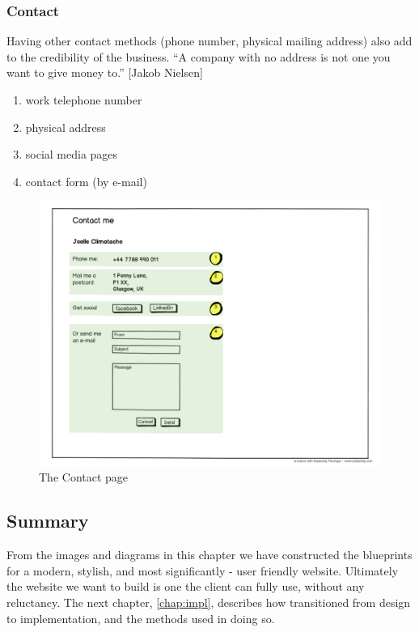 \documentclass{l3proj}
\begin{document}
\subsubsection{Contact}
Having other contact methods (phone number, physical mailing address) also add
to the credibility of the business. ``A company with no address is not one you
want to give money to.'' [Jakob Nielsen]
\begin{enumerate} \itemsep1pt \parskip0pt 
	\item work telephone number
	\item physical address
	\item social media pages
	\item contact form (by e-mail)
\end{enumerate}

\begin{figure}
\label{wireframes:contact}
\begin{center}
\includegraphics[width=\linewidth, trim = 0px 40px 0px 220px]
	{wireframes/contact}
\caption{The Contact page}
\end{center}
\end{figure}

\subsection{Summary}
From the images and diagrams in this chapter we have constructed the blueprints
for a modern, stylish, and most significantly - user friendly website.
Ultimately the website we want to build is one the client can fully use, without
any reluctancy. The next chapter, \ref{chap:impl}, describes how transitioned
from design to implementation, and the methods used in doing so.
\end{document}
